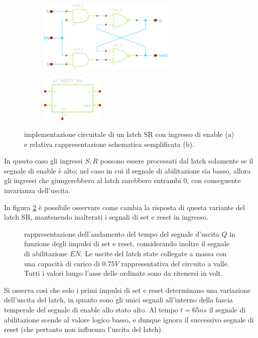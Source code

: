 	\begin{figure}[bht]
		\centering
		\begin{subfigure}{0.48\linewidth}
			\centering
			\includegraphics[width=6.5cm]{Immagini/srlatch-en-sch} \caption{}
		\end{subfigure}
		\begin{subfigure}{0.48\linewidth}
			\centering
			\includegraphics[width=3cm]{Immagini/srlatch-en-simple} \caption{}
		\end{subfigure}
		\caption{implementazione circuitale di un latch SR con ingresso di enable (a) e relativa rappresentazione schematica semplificata (b).}
		\label{fig:srl:schematico-enable}
	\end{figure}
	
	In questo caso gli ingressi $S,R$ possono essere processati dal latch solamente se il segnale di enable è alto; nel caso in cui il segnale di abilitazione sia basso, allora gli ingressi che giungerebbero al latch sarebbero entrambi 0, con conseguente invarianza dell'uscita.

	In figura \ref{fig:srl:transitorio-enable} è possibile osservare come cambia la risposta di questa variante del latch SR, mantenendo inalterati i segnali di set e reset in ingresso.
	
	\begin{figure}[bht]
		\centering
		
		\caption{rappresentazione dell'andamento del tempo del segnale d'uscita $Q$ in funzione degli impulsi di set e reset, considerando inoltre il segnale di abilitazione $EN$. Le uscite del latch state collegate a massa con una capacità di carico di $0.
		75V$ rappresentativa del circuito a valle. Tutti i valori lungo l'asse delle ordinate sono da ritenersi in volt.}
		\label{fig:srl:transitorio-enable}
	\end{figure}
	
	Si osserva così che solo i primi impulsi di set e reset determinano una variazione dell'uscita del latch, in quanto sono gli unici segnali all'interno della fascia temperale del segnale di enable allo stato alto. Al tempo $t=65ns$ il segnale di abilitazione scende al valore logico basso, e dunque ignora il successivo segnale di reset (che pertanto non influenza l'uscita del latch).
	
